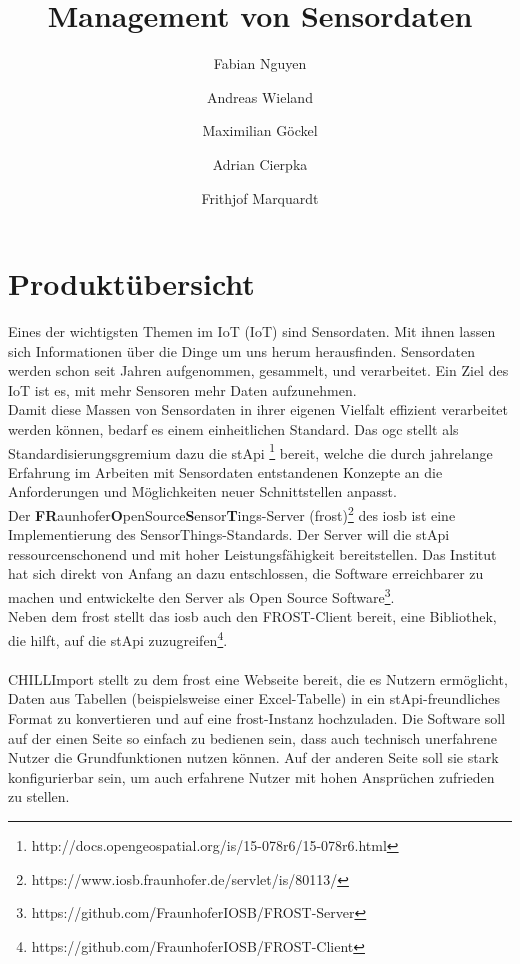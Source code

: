 \documentclass[a4paper, 12 pt]{article}
\author{Fabian Nguyen \and Andreas Wieland \and Maximilian Göckel \and Adrian Cierpka \and Frithjof Marquardt}
\title{Management von Sensordaten}
\begin{document}
\maketitle
\newpage
\tableofcontents
\newpage

	\section{Produktübersicht}

	Eines der wichtigsten Themen im \gls{IoT} (IoT) sind Sensordaten. Mit ihnen lassen sich Informationen über die Dinge um uns herum herausfinden. Sensordaten werden schon seit Jahren aufgenommen, gesammelt, und verarbeitet. Ein Ziel des IoT ist es, mit mehr Sensoren mehr Daten aufzunehmen. \\

	Damit diese Massen von Sensordaten in ihrer eigenen Vielfalt effizient verarbeitet werden können, bedarf es einem einheitlichen Standard. Das \gls{ogc} stellt als Standardisierungsgremium dazu die \gls{stApi} \footnote{http://docs.opengeospatial.org/is/15-078r6/15-078r6.html} bereit, welche die durch jahrelange Erfahrung im Arbeiten mit Sensordaten entstandenen Konzepte an die Anforderungen und Möglichkeiten neuer Schnittstellen anpasst. \\

	Der \textbf{FR}aunhofer\textbf{O}penSource\textbf{S}ensor\textbf{T}ings-Server (\gls{frost})\footnote{https://www.iosb.fraunhofer.de/servlet/is/80113/} des \gls{iosb} ist eine Implementierung des SensorThings-Standards. Der Server will die \gls{stApi} ressourcenschonend und mit hoher Leistungsfähigkeit bereitstellen. Das Institut hat sich direkt von Anfang an dazu entschlossen, die Software erreichbarer zu machen und entwickelte den Server als Open Source Software\footnote{https://github.com/FraunhoferIOSB/FROST-Server}. \\

	Neben dem \gls{frost} stellt das \gls{iosb} auch den FROST-Client bereit, eine Bibliothek, die hilft, auf die \gls{stApi} zuzugreifen\footnote{https://github.com/FraunhoferIOSB/FROST-Client}. \\
	\ \\
	CHILLImport stellt zu dem \gls{frost} eine Webseite bereit, die es Nutzern ermöglicht, Daten aus Tabellen (beispielsweise einer Excel-Tabelle) in ein \gls{stApi}-freundliches Format zu konvertieren und auf eine \gls{frost}-Instanz hochzuladen. Die Software soll auf der einen Seite so einfach zu bedienen sein, dass auch technisch unerfahrene Nutzer die Grundfunktionen nutzen können. Auf der anderen Seite soll sie stark konfigurierbar sein, um auch erfahrene Nutzer mit hohen Ansprüchen zufrieden zu stellen.\\
\end{document}
